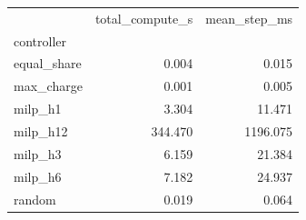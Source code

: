 \begin{tabular}{lrr}
\toprule
 & total_compute_s & mean_step_ms \\
controller &  &  \\
\midrule
equal_share & 0.004 & 0.015 \\
max_charge & 0.001 & 0.005 \\
milp_h1 & 3.304 & 11.471 \\
milp_h12 & 344.470 & 1196.075 \\
milp_h3 & 6.159 & 21.384 \\
milp_h6 & 7.182 & 24.937 \\
random & 0.019 & 0.064 \\
\bottomrule
\end{tabular}
